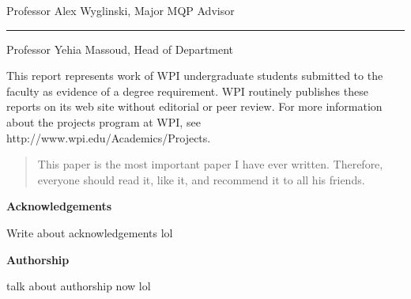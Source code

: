\documentclass[12pt]{report}
\begin{document}
	Professor Alex Wyglinski, Major MQP Advisor
	
	\vspace{0.5in}
	\rule{3in}{0.8pt}
	
	Professor Yehia Massoud, Head of Department	
	
	\brk
	This report represents work of WPI undergraduate students submitted to the faculty as evidence of a degree requirement. WPI routinely publishes these reports on its web site without editorial or peer review. For more information about the projects program at WPI, see http://www.wpi.edu/Academics/Projects.
	
	\newpage
	
	\doublespacing
	
	\begin{abstract}
		This paper is the most important paper I have ever written. Therefore,
		everyone should read it, like it, and recommend it to all his friends.
	\end{abstract}
	
	
	
	\begin{center}
		\textbf{Acknowledgements}
	\end{center}
	Write about acknowledgements lol

	\begin{center}
		\textbf{Authorship}
	\end{center}
	talk about authorship now lol

	\clearpage
	
	\tableofcontents
	
	\listoffigures
	
\end{document}
